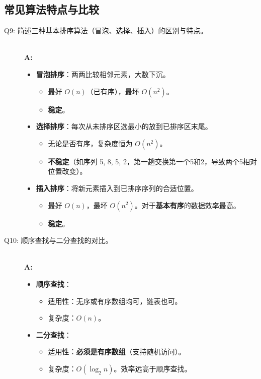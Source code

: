 \documentclass[a4paper,12pt]{article}
\begin{document}
\subsection{常见算法特点与比较}
\begin{description}
    \item[Q9: 简述三种基本排序算法（冒泡、选择、插入）的区别与特点。] \hfill \\
    \textbf{A:} 
    \begin{itemize}
        \item \textbf{冒泡排序}：两两比较相邻元素，大数下沉。
        \begin{itemize}
            \item 最好 $O(n)$（已有序），最坏 $O(n^2)$。
            \item \textbf{稳定}。
        \end{itemize}
        \item \textbf{选择排序}：每次从未排序区选最小的放到已排序区末尾。
        \begin{itemize}
            \item 无论是否有序，复杂度恒为 $O(n^2)$。
            \item \textbf{不稳定}（如序列 5, 8, 5, 2，第一趟交换第一个5和2，导致两个5相对位置改变）。
        \end{itemize}
        \item \textbf{插入排序}：将新元素插入到已排序序列的合适位置。
        \begin{itemize}
            \item 最好 $O(n)$，最坏 $O(n^2)$。对于\textbf{基本有序}的数据效率最高。
            \item \textbf{稳定}。
        \end{itemize}
    \end{itemize}

    \item[Q10: 顺序查找与二分查找的对比。] \hfill \\
    \textbf{A:} 
    \begin{itemize}
        \item \textbf{顺序查找}：
        \begin{itemize}
            \item 适用性：无序或有序数组均可，链表也可。
            \item 复杂度：$O(n)$。
        \end{itemize}
        \item \textbf{二分查找}：
        \begin{itemize}
            \item 适用性：\textbf{必须是有序数组}（支持随机访问）。
            \item 复杂度：$O(\log_2 n)$。效率远高于顺序查找。
        \end{itemize}
    \end{itemize}


\end{description}
\end{document}
